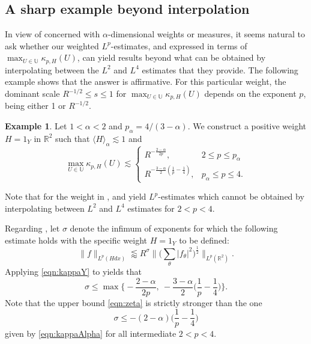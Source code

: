 \documentclass[11pt]{amsart}
\theoremstyle{definition}
\newtheorem{ex}{Example}
\theoremstyle{remark}
\newcommand{\R}{\mathbb{R}}
\newcommand{\U}{\mathbb{U}}
\newcommand{\les}{\lesssim}
\newcommand{\less}{\lessapprox}
\newcommand{\inn}[1]{\langle  #1 \rangle}
\begin{document}
\subsection{A sharp example beyond interpolation}\label{sec:exInterpolation}
In view of  concerned with $\alpha$-dimensional weights or measures, it seems natural to ask whether our weighted $L^p$-estimates,  and  expressed in terms of $\max_{U\in \U} \kappa_{p,H}(U)$, can yield results beyond what can be obtained by interpolating between the $L^2$ and $L^4$ estimates that they provide. The following example shows that the answer is affirmative. For this particular weight, the dominant scale $R^{-1/2}\leq s\leq 1$ for $\max_{U\in \U} \kappa_{p,H}(U)$ depends on the exponent $p$, being either 1 or $R^{-1/2}$.
\begin{ex}\label{ex:Y}
Let $1< \alpha < 2$ and $p_\alpha = 4/(3-\alpha)$. We construct a positive weight $H=1_Y$ in $\R^2$ such that $\inn{H}_\alpha \lesssim1$ and
\begin{equation}\label{eqn:kappaY}
		\max_{U\in \U} \kappa_{p,H}(U)  
		\les \begin{cases}
		R^{-\frac{2-\alpha}{2p}}, &  2\leq p\leq p_\alpha\\[1ex]
		R^{-\frac{3-\alpha}2(\frac1p-\frac14)}, & p_\alpha \leq p\leq 4.
	\end{cases}
\end{equation}
\end{ex}

Note that for the weight in ,  and   yield $L^p$-estimates which cannot be obtained by interpolating between $L^2$ and $L^4$ estimates for $2<p<4$.

Regarding , let $\sigma$ denote the infimum of exponents for which the following estimate holds with the specific weight $H=1_Y$ to be defined: 
\[ \|f\|_{L^p(Hdx)} \less R^\sigma \big\| \big(\sum_\theta |f_\theta|^2 \big)^{\frac12} \big\|_{L^p(\R^2)}. \]
Applying \eqref{eqn:kappaY} to  yields that
\begin{equation}\label{eqn:zeta}
\sigma \le \max \Big\{ -\frac{2-\alpha}{2p},~ -\frac{3-\alpha}2\Big(\frac1p-\frac14\Big)\Big\}.
 \end{equation}
 Note that the upper bound \eqref{eqn:zeta} is strictly stronger than the one
 \begin{equation}\label{eqn:kappaAlpha1}
 	\sigma \le -(2-\alpha) \Big(\frac{1}{p}-\frac{1}{4}\Big)
 \end{equation}
given by \eqref{eqn:kappaAlpha} for all intermediate $2<p<4$.  
\end{document}
